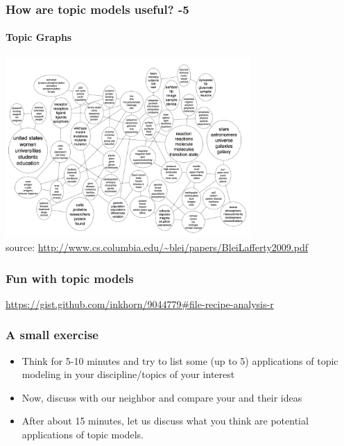 \documentclass{beamer}
\begin{document}
\begin{frame}
\frametitle{How are topic models useful?  -5}
\framesubtitle{Topic Graphs}
\includegraphics[width=0.7\textwidth]{topicgraph.png}
\footnotesize \\ source: \url{http://www.cs.columbia.edu/~blei/papers/BleiLafferty2009.pdf}
\end{frame}

\begin{frame}
\frametitle{Fun with topic models}
\url{https://gist.github.com/inkhorn/9044779\#file-recipe-analysis-r}
\end{frame}

\begin{frame}
\frametitle{A small exercise}
\begin{itemize}
\item Think for 5-10 minutes and try to list some (up to 5) applications of topic modeling in your discipline/topics of your interest
\item Now, discuss with our neighbor and compare your and their ideas
\item After about 15 minutes, let us discuss what you think are potential applications of topic models.
\end{itemize}
\end{frame}
\end{document}
